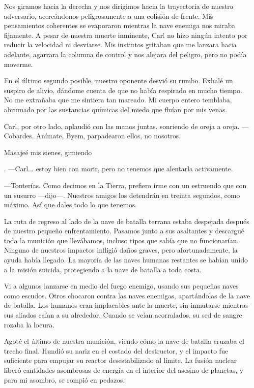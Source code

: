 \documentclass[spanish,12pt,a4paper,oneside,titlepage]{book}
\begin{document}
    Nos giramos hacia la derecha y nos dirigimos hacia la trayectoria de nuestro adversario, acercándonos peligrosamente a una colisión de frente. Mis pensamientos coherentes se evaporaron mientras la nave enemiga nos miraba fijamente. A pesar de nuestra muerte inminente, Carl no hizo ningún intento por reducir la velocidad ni desviarse. Mis instintos gritaban que me lanzara hacia adelante, agarrara la columna de control y nos alejara del peligro, pero no podía moverme.

    En el último segundo posible, nuestro oponente desvió su rumbo. Exhalé un suspiro de alivio, dándome cuenta de que no había respirado en mucho tiempo. No me extrañaba que me sintiera tan mareado. Mi cuerpo entero temblaba, abrumado por las sustancias químicas del miedo que fluían por mis venas.

    Carl, por otro lado, aplaudió con las manos juntas, sonriendo de oreja a oreja. —Cobardes. Anímate, Byem, parpadearon ellos, no nosotros.

    Masajeé mis sienes, gimiendo

    . —Carl... estoy bien con morir, pero no tenemos que alentarla activamente.

    —Tonterías. Como decimos en la Tierra, prefiero irme con un estruendo que con un susurro —dijo—. Nuestros amigos los detendrán en treinta segundos, como máximo. Así que dales todo lo que tenemos.

    La ruta de regreso al lado de la nave de batalla terrana estaba despejada después de nuestro pequeño enfrentamiento. Pasamos junto a sus asaltantes y descargué toda la munición que llevábamos, incluso tipos que sabía que no funcionarían. Ninguno de nuestros impactos infligió daños graves, pero afortunadamente, la ayuda había llegado. La mayoría de las naves humanas restantes se habían unido a la misión suicida, protegiendo a la nave de batalla a toda costa.

    Vi a algunos lanzarse en medio del fuego enemigo, usando sus pequeñas naves como escudos. Otros chocaron contra las naves enemigas, apartándolas de la nave de batalla. Los humanos eran implacables ante la muerte, sin inmutarse mientras sus aliados caían a su alrededor. Cuando se veían acorralados, su sed de sangre rozaba la locura.

    Agoté el último de nuestra munición, viendo cómo la nave de batalla cruzaba el trecho final. Hundió su nariz en el costado del destructor, y el impacto fue suficiente para empujar su reactor desestabilizado al límite. La fusión nuclear liberó cantidades asombrosas de energía en el interior del asesino de planetas, y para mi asombro, se rompió en pedazos.
\end{document}
